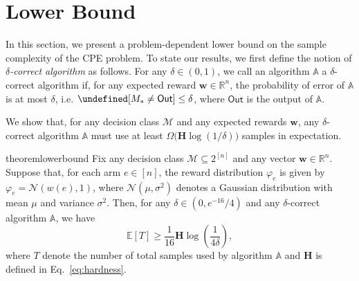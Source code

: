 \documentclass{article}
\newcommand{\Problem}{{CPE}\xspace}
\newcommand{\Rew}{\varphi}
\newcommand{\E}{\mathbb E}
\newcommand{\M}{\mathcal M}
\newcommand{\B}{\mathcal B}
\newcommand{\RR}{\mathbb R}
\newcommand{\out}{\mathsf{Out}}
\let\Pr\undefined
\DeclareMathOperator{\Pr}{Pr}
\renewcommand{\vec}[1]{\boldsymbol{#1}}
\begin{document}




\vspace{-0.7em}
\section{Lower Bound}
\vspace{-0.7em}
In this section, we present a problem-dependent lower bound on the sample complexity of the \Problem problem. 
To state our results, we first define the notion of \emph{$\delta$-correct algorithm} as follows.
For any $\delta \in (0,1)$, we call an algorithm $\mathbb A$ a $\delta$-correct algorithm if, for any expected reward $\vec w \in \RR^{n}$, the probability of error of $\mathbb A$ is at most $\delta$, i.e. $\Pr[M_*\not =\out] \le \delta$, where $\out$ is the output of $\mathbb A$.

We show that, for any decision class $\M$ and any expected rewards $\vec w$, any $\delta$-correct algorithm $\mathbb A$ must use at least $\Omega\big(\mathbf H \log(1/\delta) \big)$ samples in expectation.
\begin{restatable}{theorem}{lowerbound}
Fix any decision class $\M\subseteq 2^{[n]}$ and any vector $\vec w \in \RR^n$.
Suppose that, for each arm $e\in [n]$, the reward distribution $\Rew_e$ is given by $\Rew_e=\mathcal N(w(e),1)$, where $\mathcal N(\mu, \sigma^2)$ denotes a Gaussian distribution with mean $\mu$ and variance $\sigma^2$. 
Then, for any $\delta \in (0,e^{-16}/4)$ and any $\delta$-correct algorithm $\mathbb A$, we have
\begin{equation}
\label{eq:lower-bound}
\E[T] \ge \frac{1}{16} \mathbf H \log\left(\frac{1}{4\delta}\right),
\end{equation}
where 
$T$ denote the number of total samples used by algorithm $\mathbb A$ and
$\mathbf H$ is defined in Eq.~\eqref{eq:hardness}.
\label{theorem:lower-bound}
\end{restatable}
\end{document}
